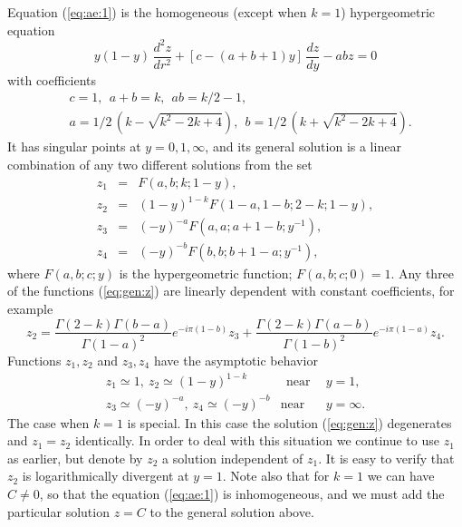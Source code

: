 Equation (\ref{eq:ae:1}) is the homogeneous (except when $k=1$)
hypergeometric equation
\begin{equation} \label{eq:hyper}
  y(1-y)\, \frac{d^2z}{dr^2} + [c - (a+b+1)y]\, \frac{dz}{dy} - ab z = 0
\end{equation}
with coefficients
\begin{eqnarray} \label{eq:coeff:1}
  &c = 1,\ \ a+b = k,\ \ ab = k/2 - 1, \nonumber\\
  &a = 1/2\, (k - \sqrt{k^2-2k+4}),\ \ b = 1/2\, (k + \sqrt{k^2-2k+4}).
\end{eqnarray}
It has singular points at $y=0,1,\infty$, and its general solution is a
linear combination of any two different solutions from the set
\begin{eqnarray} \label{eq:gen:z}
  z_1 &=& F(a, b; k; 1-y),\nonumber\\
  z_2 &=& (1-y)^{1-k} F(1-a, 1-b; 2-k; 1-y),\nonumber\\
  z_3 &=& (-y)^{-a} F(a, a; a+1-b; y^{-1}),\nonumber\\
  z_4 &=& (-y)^{-b} F(b, b; b+1-a; y^{-1}),
\end{eqnarray}
where $F(a, b; c; y)$ is the hypergeometric function; $F(a,b;c;0) = 1$.
Any three of the functions (\ref{eq:gen:z}) are linearly dependent with
constant coefficients, for example
\begin{equation} \label{eq:hyper:connect}
  z_2 =
    \frac{\Gamma(2-k)\Gamma(b-a)}{\Gamma(1-a)^2}
      e^{-i\pi(1-b)} z_3 +
    \frac{\Gamma(2-k)\Gamma(a-b)}{\Gamma(1-b)^2}
      e^{-i\pi(1-a)} z_4.
\end{equation}
Functions $z_1,z_2$ and $z_3,z_4$ have the asymptotic behavior
\begin{eqnarray} \label{eq:asympt:z}
  z_1 \simeq 1,\ 
  z_2 \simeq (1-y)^{1-k} &\ \ \text{near}\ \ & y=1,\nonumber\\
  z_3 \simeq (-y)^{-a},\ 
  z_4 \simeq (-y)^{-b} &\text{near}& y=\infty.
\end{eqnarray}
The case when $k=1$ is special. In this case the solution
(\ref{eq:gen:z}) degenerates and $z_1 = z_2$ identically. In order to
deal with this situation we continue to use $z_1$ as earlier, but
denote by $z_2$ a solution independent of $z_1$. It is easy to verify
that $z_2$ is logarithmically divergent at $y=1$. Note also that for
$k=1$ we can have $C \ne 0$, so that the equation (\ref{eq:ae:1}) is
inhomogeneous, and we must add the particular solution $z=C$ to the
general solution above.

